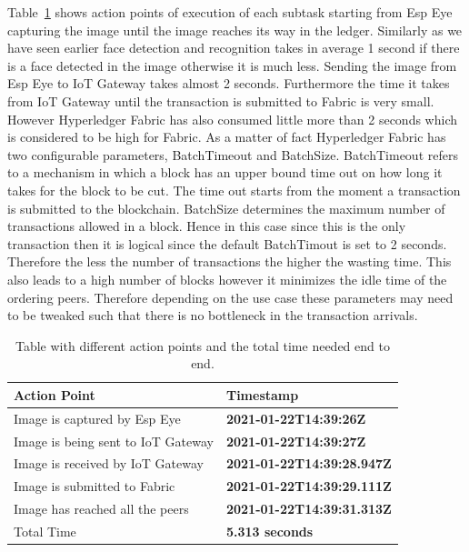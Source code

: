 Table~\ref{actionpoint} shows action points of execution of each subtask starting from Esp Eye capturing the image until the image reaches its way in the ledger. Similarly as we have seen earlier face detection and recognition takes in average 1 second if there is a face detected in the image otherwise it is much less. Sending the image from Esp Eye to IoT Gateway takes almost 2 seconds. Furthermore the time it takes from IoT Gateway until the transaction is submitted to Fabric is very small. 
However Hyperledger Fabric has also consumed little more than 2 seconds which is considered to be high for Fabric. As a matter of fact Hyperledger Fabric has two configurable parameters, BatchTimeout and BatchSize. BatchTimeout refers to a mechanism in which a block has an upper bound time out on how long it takes for the block to be cut. The time out starts from the moment a transaction is submitted to the blockchain. BatchSize determines the maximum number of transactions allowed in a block. 
Hence in this case since this is the only transaction then it is logical since the default BatchTimout is set to 2 seconds. Therefore the less the number of transactions the higher the wasting time. This also leads to a high number of blocks however it minimizes the idle time of the ordering peers. Therefore depending on the use case these parameters may need to be tweaked such that there is no bottleneck in the transaction arrivals.  




\begin{table}[hbt!]

    
    \begin{tabular}{  p{7.4cm}  p{7.4cm}   }
      
\textbf{Action Point}      
& \textbf{Timestamp}   
\\\midrule
Image is captured by Esp Eye & \textbf{2021-01-22T14:39:26Z}         
\\\hline

Image is being sent to IoT Gateway & \textbf{2021-01-22T14:39:27Z}      
 \\\hline
Image is received by IoT Gateway & \textbf{2021-01-22T14:39:28.947Z}   
 \\\hline
Image is submitted to Fabric & \textbf{2021-01-22T14:39:29.111Z}
 \\\hline
Image has reached all the peers  & \textbf{2021-01-22T14:39:31.313Z}
 \\\hline
Total Time & \textbf{5.313 seconds}
 \\
        \bottomrule
    \end{tabular}
    \caption{Table with different action points and the total time needed end to end.}
    \label{actionpoint}
\end{table}


